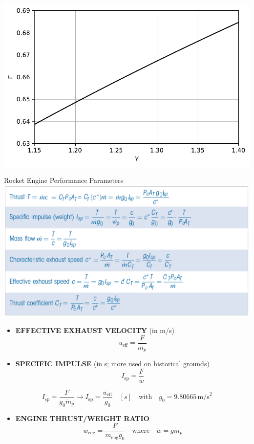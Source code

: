\documentclass[
  ignorenonframetext,
]{beamer}
\providecommand{\tightlist}{%
  \setlength{\itemsep}{0pt}\setlength{\parskip}{0pt}}\usepackage{longtable,booktabs,array}
\begin{document}
\begin{frame}
\includegraphics{lecture4_files/figure-beamer/cell-2-output-1.pdf}
\end{frame}

\begin{frame}
\begin{block}{Rocket Engine Performance Parameters}
\protect\hypertarget{rocket-engine-performance-parameters}{}
\includegraphics{tabs/tab4.4.png}
\end{block}
\end{frame}

\begin{frame}
\begin{itemize}
\item
  \textbf{EFFECTIVE EXHAUST VELOCITY} (in m/s)
  \[u_{\text{eff}} = \frac{F}{\dot{m}_p}\]
\item
  \textbf{SPECIFIC IMPULSE} (in s; more used on historical grounds)
  \[I_{\text{sp}} = \frac{F}{\dot{w}}\]
\end{itemize}

\[I_{\text{sp}} = \frac{F}{g_0 \dot{m}_p} \rightarrow I_{\text{sp}} = \frac{u_{\text{eff}}}{g_0} \quad [s] \quad \text{with} \quad g_0 = 9.80665 \, \text{m/s}^2\]

\begin{itemize}
\tightlist
\item
  \textbf{ENGINE THRUST/WEIGHT RATIO}
  \[w_{\text{eng}} = \frac{F}{m_{\text{eng}} g_0} \quad \text{where} \quad \dot{w} = g\dot{m}_p\]
\end{itemize}
\end{frame}
\end{document}
